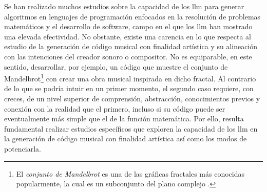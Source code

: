 Se han realizado muchos estudios sobre la capacidad de los \gls{llm} para generar algoritmos en lenguajes de programación enfocados en la resolución de problemas matemáticos y el desarrollo de {software}, campo en el que los \gls{llm} han mostrado una elevada efectividad. No obstante, existe una carencia en lo que respecta al estudio de la generación de código musical con finalidad artística y su alineación con las intenciones del creador sonoro o compositor. No es equiparable, en este sentido, desarrollar, por ejemplo, un código que muestre el conjunto de Mandelbrot\footnote{El \emph{conjunto de Mandelbrot} es una de las gráficas fractales más conocidas popularmente, la cual es un subconjunto del plano complejo \citep{ConjuntoMandelbrot2024}.} con crear una obra musical inspirada en dicho fractal. Al contrario de lo que se podría intuir en un primer momento, el segundo caso requiere, con creces, de un nivel superior de comprensión, abstracción, conocimientos previos y conexión con la realidad que el primero, incluso si su código puede ser eventualmente más simple que el de la función matemática. Por ello, resulta fundamental realizar estudios específicos que exploren la capacidad de los \gls{llm} en la generación de código musical con finalidad artística así como los modos de potenciarla.



